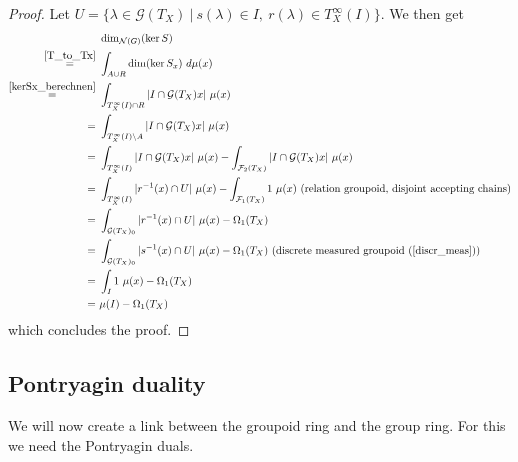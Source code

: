 \documentclass[12pt,a4paper]{scrartcl}
\theoremstyle{plain}
\theoremstyle{definition}
\numberwithin{equation}{section}
\newcommand{\2}{\mathbb{Z} / 2 \mathbb{Z}}
\newcommand{\G}{\mathcal{G}}
\newcommand{\1}{\bar{1}}
\newcommand{\0}{\bar{0}}
\begin{document}
\begin{proof}
	Let $U = \{\lambda \in \G (T_X)~|~ s(\lambda) \in I,~ r(\lambda) \in T_X^\infty(I)\}$. We then get
	\begin{align*}
		 &~ \dim_{\mathcal{N}(G)}(\ker S) \\
		\overset{\ref{T_to_Tx}}{=}&~ \int_{A \cup R} \dim (\ker S_x) \ d \mu (x) \\
		\overset{\ref{kerSx_berechnen}}{=}&~ \int_{T_X^\infty(I) \cap R} |I \cap \G (T_X)x| \ \mu (x) \\
		=&~ \int_{T_X^\infty(I) \setminus A} |I \cap \G (T_X)x| \ \mu (x) \\
		=&~ \int_{T_X^\infty(I)} |I \cap \G (T_X)x| \ \mu (x) - \int_{\mathcal{F}_2(T_X)} |I \cap \G (T_X)x| \ \mu (x) \\
		=&~ \int_{T_X^\infty(I)} |r^{-1}(x) \cap U| \ \mu (x)  - \int_{\mathcal{F}_1(T_X)} 1 \ \mu (x) ~ \text{(relation groupoid, disjoint accepting chains)}\\
		=&~ \int_{\G (T_X)_0} |r^{-1}(x) \cap U| \ \mu (x) - \Omega_1(T_X) \\
		=&~ \int_{\G (T_X)_0} |s^{-1}(x) \cap U| \ \mu (x) - \Omega_1(T_X) ~ \text{(discrete measured groupoid (\ref{discr_meas}))} \\
		=&~ \int_{I} 1 \ \mu (x) - \Omega_1(T_X) \\
		=&~ \mu(I) - \Omega_1(T_X)
	\end{align*}
	which concludes the proof.
\end{proof}
\subsection{Pontryagin duality}
We will now create a link between the groupoid ring and the group ring. For this we need the Pontryagin duals.
\end{document}
